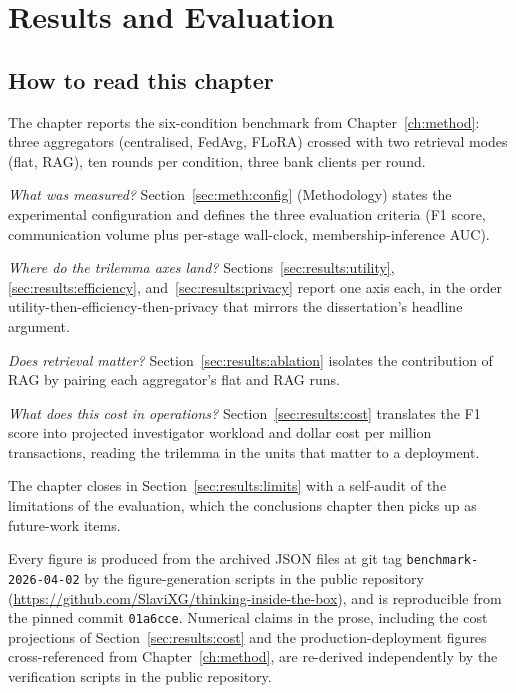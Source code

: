 \documentclass{report}
\begin{document}
\chapter{Results and Evaluation}
\label{ch:results}

\section*{How to read this chapter}

The chapter reports the six-condition benchmark from Chapter~\ref{ch:method}: three aggregators (centralised, FedAvg, FLoRA) crossed with two retrieval modes (flat, RAG), ten rounds per condition, three bank clients per round.

\textit{What was measured?} Section~\ref{sec:meth:config} (Methodology) states the experimental configuration and defines the three evaluation criteria (F1 score, communication volume plus per-stage wall-clock, membership-inference AUC).

\textit{Where do the trilemma axes land?} Sections~\ref{sec:results:utility}, \ref{sec:results:efficiency}, and~\ref{sec:results:privacy} report one axis each, in the order utility-then-efficiency-then-privacy that mirrors the dissertation's headline argument.

\textit{Does retrieval matter?} Section~\ref{sec:results:ablation} isolates the contribution of RAG by pairing each aggregator's flat and RAG runs.

\textit{What does this cost in operations?} Section~\ref{sec:results:cost} translates the F1 score into projected investigator workload and dollar cost per million transactions, reading the trilemma in the units that matter to a deployment.

The chapter closes in Section~\ref{sec:results:limits} with a self-audit of the limitations of the evaluation, which the conclusions chapter then picks up as future-work items.

Every figure is produced from the archived JSON files at git tag \texttt{benchmark-2026-04-02} by the figure-generation scripts in the public repository (\url{https://github.com/SlaviXG/thinking-inside-the-box}), and is reproducible from the pinned commit \texttt{01a6cce}. Numerical claims in the prose, including the cost projections of Section~\ref{sec:results:cost} and the production-deployment figures cross-referenced from Chapter~\ref{ch:method}, are re-derived independently by the verification scripts in the public repository.
\end{document}
